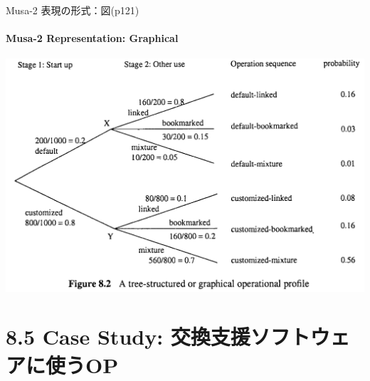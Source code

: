 \begin{frame}{Musa-2 表現の形式：図(p121)}
\framesubtitle{Musa-2 Representation: Graphical}
\begin{center}
\includegraphics[width=\textwidth,height=0.8\textheight,keepaspectratio]{figure/graphical.png}
\end{center}
\end{frame}
\section{8.5 Case Study: 交換支援ソフトウェアに使うOP}
